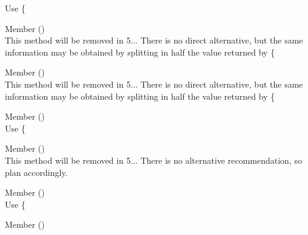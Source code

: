 \begin{DoxyRefList}
\label{deprecated__deprecated000274}%
%
Use \{ 
\item[Member \doxylink{interface_ramsey_1_1_uuid_1_1_deprecated_uuid_interface_ac5ef30f9804da25452c48adc4aa556ab}{Ramsey\textbackslash{}Uuid\textbackslash{}Deprecated\+Uuid\+Interface\+::get\+Least\+Significant\+Bits\+Hex} ()]\hfill \\
\label{deprecated__deprecated000279}%
%
This method will be removed in 5... There is no direct alternative, but the same information may be obtained by splitting in half the value returned by \{ 
\item[Member \doxylink{interface_ramsey_1_1_uuid_1_1_deprecated_uuid_interface_aed814aa7eb38a221b79f285eeb22b836}{Ramsey\textbackslash{}Uuid\textbackslash{}Deprecated\+Uuid\+Interface\+::get\+Most\+Significant\+Bits\+Hex} ()]\hfill \\
\label{deprecated__deprecated000280}%
%
This method will be removed in 5... There is no direct alternative, but the same information may be obtained by splitting in half the value returned by \{ 
\item[Member \doxylink{interface_ramsey_1_1_uuid_1_1_deprecated_uuid_interface_a53bec6459afd4e88c2a6c6fb5e904d47}{Ramsey\textbackslash{}Uuid\textbackslash{}Deprecated\+Uuid\+Interface\+::get\+Node\+Hex} ()]\hfill \\
\label{deprecated__deprecated000281}%
%
Use \{ 
\item[Member \doxylink{interface_ramsey_1_1_uuid_1_1_deprecated_uuid_interface_a55729c5d8161a966887fec859f2278a3}{Ramsey\textbackslash{}Uuid\textbackslash{}Deprecated\+Uuid\+Interface\+::get\+Number\+Converter} ()]\hfill \\
\label{deprecated__deprecated000273}%
%
This method will be removed in 5... There is no alternative recommendation, so plan accordingly.  
\item[Member \doxylink{interface_ramsey_1_1_uuid_1_1_deprecated_uuid_interface_a113bb9412c81688429e9d130536c5e58}{Ramsey\textbackslash{}Uuid\textbackslash{}Deprecated\+Uuid\+Interface\+::get\+Time\+Hi\+And\+Version\+Hex} ()]\hfill \\
\label{deprecated__deprecated000282}%
%
Use \{ 
\item[Member \doxylink{interface_ramsey_1_1_uuid_1_1_deprecated_uuid_interface_a9830d9e12a3d73009f4cf36bc6da8350}{Ramsey\textbackslash{}Uuid\textbackslash{}Deprecated\+Uuid\+Interface\+::get\+Time\+Low\+Hex} ()]\hfill \\

\end{DoxyRefList}
